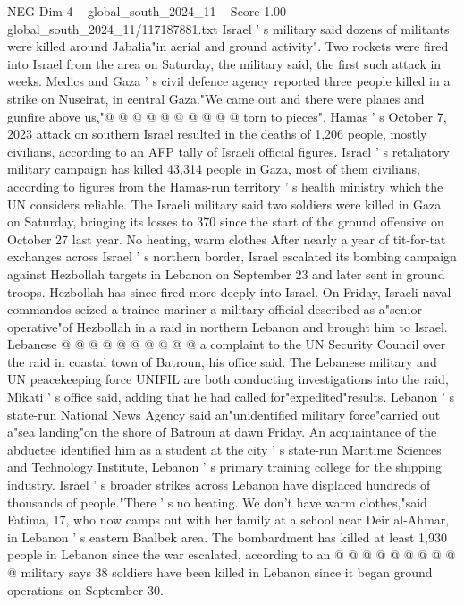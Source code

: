 \begin{textsample}{NEG Dim 4 – global\_south\_2024\_11 – Score 1.00 – global\_south\_2024\_11/117187881.txt}
Israel ' s military said dozens of militants were killed around Jabalia"in aerial and ground activity".
Two rockets were fired into Israel from the area on Saturday, the military said, the first such attack in weeks.
Medics and Gaza ' s civil defence agency reported three people killed in a strike on Nuseirat, in central Gaza."We came out and there were planes and gunfire above us,"@ @ @ @ @ @ @ @ @ @ torn to pieces".
Hamas ' s October 7, 2023 attack on southern Israel resulted in the deaths of 1,206 people, mostly civilians, according to an AFP tally of Israeli official figures.
Israel ' s retaliatory military campaign has killed 43,314 people in Gaza, most of them civilians, according to figures from the Hamas-run territory ' s health ministry which the UN considers reliable.
The Israeli military said two soldiers were killed in Gaza on Saturday, bringing its losses to 370 since the start of the ground offensive on October 27 last year.
No heating, warm clothes After nearly a year of tit-for-tat exchanges across Israel ' s northern border, Israel escalated its bombing campaign against Hezbollah targets in Lebanon on September 23 and later sent in ground troops.
Hezbollah has since fired more deeply into Israel.
On Friday, Israeli naval commandos seized a trainee mariner a military official described as a"senior operative"of Hezbollah in a raid in northern Lebanon and brought him to Israel.
Lebanese @ @ @ @ @ @ @ @ @ @ a complaint to the UN Security Council over the raid in coastal town of Batroun, his office said.
The Lebanese military and UN peacekeeping force UNIFIL are both conducting investigations into the raid, Mikati ' s office said, adding that he had called for"expedited"results.
Lebanon ' s state-run National News Agency said an"unidentified military force"carried out a"sea landing"on the shore of Batroun at dawn Friday.
An acquaintance of the abductee identified him as a student at the city ' s state-run Maritime Sciences and Technology Institute, Lebanon ' s primary training college for the shipping industry.
Israel ' s broader strikes across Lebanon have displaced hundreds of thousands of people."There ' s no heating.
We don't have warm clothes,"said Fatima, 17, who now camps out with her family at a school near Deir al-Ahmar, in Lebanon ' s eastern Baalbek area.
The bombardment has killed at least 1,930 people in Lebanon since the war escalated, according to an @ @ @ @ @ @ @ @ @ @ military says 38 soldiers have been killed in Lebanon since it began ground operations on September 30.

\end{textsample}
